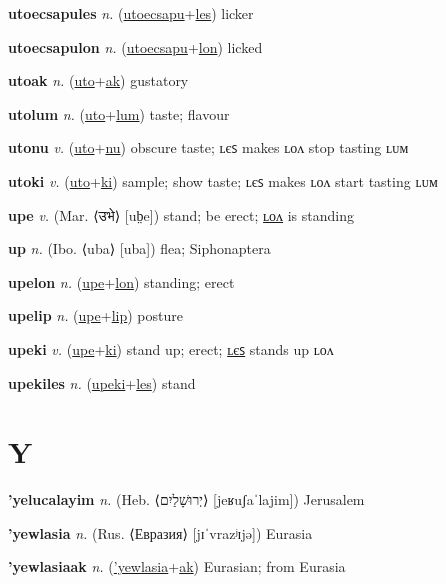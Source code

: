 \textbf{\hypertarget{utoecsapules}{utoecsapules}} \textit{n.} (\hyperlink{utoecsapu}{utoecsapu}+\allowbreak \hyperlink{les}{les})
licker

\textbf{\hypertarget{utoecsapulon}{utoecsapulon}} \textit{n.} (\hyperlink{utoecsapu}{utoecsapu}+\allowbreak \hyperlink{lon}{lon})
licked

\textbf{\hypertarget{utoak}{utoak}} \textit{n.} (\hyperlink{uto}{uto}+\allowbreak \hyperlink{ak}{ak})
gustatory

\textbf{\hypertarget{utolum}{utolum}} \textit{n.} (\hyperlink{uto}{uto}+\allowbreak \hyperlink{lum}{lum})
taste; flavour

\textbf{\hypertarget{utonu}{utonu}} \textit{v.} (\hyperlink{uto}{uto}+\allowbreak \hyperlink{nu}{nu})
obscure taste; ʟєꜱ makes ʟᴏᴧ stop tasting ʟᴜᴍ

\textbf{\hypertarget{utoki}{utoki}} \textit{v.} (\hyperlink{uto}{uto}+\allowbreak \hyperlink{ki}{ki})
sample; show taste; ʟєꜱ makes ʟᴏᴧ start tasting ʟᴜᴍ

\textbf{\hypertarget{upe}{upe}} \textit{v.} (Mar. ⟨{\devanagari{}उभे}⟩ [ub̤e])
stand; be erect; \hyperlink{upelon}{ʟᴏᴧ} is standing

\textbf{\hypertarget{up}{up}} \textit{n.} (Ibo. ⟨uba⟩ [uba])
flea; Siphonaptera

\textbf{\hypertarget{upelon}{upelon}} \textit{n.} (\hyperlink{upe}{upe}+\allowbreak \hyperlink{lon}{lon})
standing; erect

\textbf{\hypertarget{upelip}{upelip}} \textit{n.} (\hyperlink{upe}{upe}+\allowbreak \hyperlink{lip}{lip})
posture

\textbf{\hypertarget{upeki}{upeki}} \textit{v.} (\hyperlink{upe}{upe}+\allowbreak \hyperlink{ki}{ki})
stand up; erect; \hyperlink{upekiles}{ʟєꜱ} stands up ʟᴏᴧ

\textbf{\hypertarget{upekiles}{upekiles}} \textit{n.} (\hyperlink{upeki}{upeki}+\allowbreak \hyperlink{les}{les})
stand

\section{Y}

\textbf{\hypertarget{'yelucalayim}{'yelucalayim}} \textit{n.} (Heb. ⟨{\hebrew{}יְרוּשָׁלַיִם}⟩ [jeʁuʃaˈlajim])
Jerusalem

\textbf{\hypertarget{'yewlasia}{'yewlasia}} \textit{n.} (Rus. ⟨Евразия⟩ [jɪˈvrazʲɪjə])
Eurasia

\textbf{\hypertarget{'yewlasiaak}{'yewlasiaak}} \textit{n.} (\hyperlink{'yewlasia}{'yewlasia}+\allowbreak \hyperlink{ak}{ak})
Eurasian; from Eurasia

